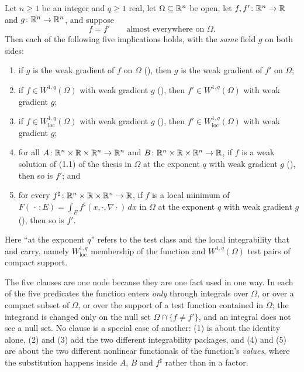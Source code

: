\begin{lemma}
Let $n\ge1$ be an integer and $q\ge1$ real, let $\Omega\subseteq\mathbb{R}^n$ be open,
let $f,f'\colon\mathbb{R}^n\to\mathbb{R}$ and $g\colon\mathbb{R}^n\to\mathbb{R}^n$, and suppose
\[
f=f'\qquad\text{almost everywhere on }\Omega .
\]
Then each of the following five implications holds, with the \emph{same} field
$g$ on both sides:
\begin{enumerate}
\item if $g$ is the weak gradient of $f$ on $\Omega$
  (), then $g$ is the weak gradient of $f'$ on
  $\Omega$;
\item if $f\in W^{1,q}(\Omega)$ with weak gradient $g$ (),
  then $f'\in W^{1,q}(\Omega)$ with weak gradient $g$;
\item if $f\in W^{1,q}_{\mathrm{loc}}(\Omega)$ with weak gradient $g$
  (), then $f'\in W^{1,q}_{\mathrm{loc}}(\Omega)$ with weak
  gradient $g$;
\item for all $A\colon\mathbb{R}^n\times\mathbb{R}\times\mathbb{R}^n\to\mathbb{R}^n$ and
  $B\colon\mathbb{R}^n\times\mathbb{R}\times\mathbb{R}^n\to\mathbb{R}$, if $f$ is a weak solution of
  (1.1) of the thesis in $\Omega$ at the exponent $q$ with weak gradient $g$
  (), then so is $f'$; and
\item for every $f^{\sharp}\colon\mathbb{R}^n\times\mathbb{R}\times\mathbb{R}^n\to\mathbb{R}$, if $f$ is a local
  minimum of $F(\,\cdot\,;E)=\int_Ef^{\sharp}(x,\cdot,\nabla\cdot)\,dx$ in
  $\Omega$ at the exponent $q$ with weak gradient $g$
  (), then so is $f'$.
\end{enumerate}
Here ``at the exponent $q$'' refers to the test class and the local
integrability that  and 
carry, namely $W^{1,q}_{\mathrm{loc}}$ membership of the function and
$W^{1,q}(\Omega)$ test pairs of compact support.

The five clauses are one node because they are one fact used in one way.  In
each of the five predicates the function enters \emph{only} through integrals
over $\Omega$, or over a compact subset of $\Omega$, or over the support of a
test function contained in $\Omega$; the integrand is changed only on the null
set $\Omega\cap\{f\ne f'\}$, and an integral does not see a null set.  No clause
is a special case of another: (1) is about the identity alone, (2) and (3) add
the two different integrability packages, and (4) and (5) are about the two
different nonlinear functionals of the function's \emph{values}, where the
substitution happens inside $A$, $B$ and $f^{\sharp}$ rather than in a factor.


\end{lemma}
